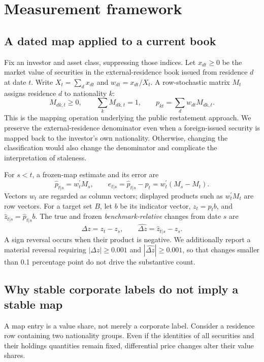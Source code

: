 \documentclass[11pt,a4paper]{article}
\begin{document}
\section{Measurement framework}
\subsection{A dated map applied to a current book}
Fix an investor and asset class, suppressing those indices. Let $x_{dt}\geq0$ be the market value of securities in the external-residence book issued from residence $d$ at date $t$. Write $X_t=\sum_d x_{dt}$ and $w_{dt}=x_{dt}/X_t$. A row-stochastic matrix $M_t$ assigns residence $d$ to nationality $k$:
\begin{equation}
 M_{dk,t}\geq0,\qquad \sum_k M_{dk,t}=1,\qquad
 p_{kt}=\sum_d w_{dt}M_{dk,t}.
 \label{eq:map}
\end{equation}
This is the mapping operation underlying the public restatement approach. We preserve the external-residence denominator even when a foreign-issued security is mapped back to the investor's own nationality. Otherwise, changing the classification would also change the denominator and complicate the interpretation of staleness.

For $s<t$, a frozen-map estimate and its error are
\begin{equation}
 \widehat p_{t|s}=w_t^{\prime}M_s,\qquad
 e_{t|s}=\widehat p_{t|s}-p_t=w_t^{\prime}(M_s-M_t).
 \label{eq:error}
\end{equation}
Vectors $w_t$ are regarded as column vectors; displayed products such as $w_t^{\prime}M_t$ are row vectors. For a target set $B$, let $b$ be its indicator vector, $z_t=p_tb$, and $\widehat z_{t|s}=\widehat p_{t|s}b$. The true and frozen \emph{benchmark-relative} changes from date $s$ are
\begin{equation}
 \Delta z=z_t-z_s,\qquad
 \widehat{\Delta z}=\widehat z_{t|s}-z_s.
 \label{eq:changes}
\end{equation}
A sign reversal occurs when their product is negative. We additionally report a material reversal requiring $|\Delta z|\geq0.001$ and $|\widehat{\Delta z}|\geq0.001$, so that changes smaller than 0.1 percentage point do not drive the substantive count.

\subsection{Why stable corporate labels do not imply a stable map}
A map entry is a value share, not merely a corporate label. Consider a residence row containing two nationality groups. Even if the identities of all securities and their holdings quantities remain fixed, differential price changes alter their value shares.
\end{document}
